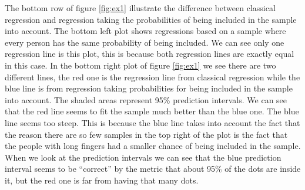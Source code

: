 \documentclass{article}
\begin{document}
\begin{example}
\begin{figure}
\end{figure}


The bottom row of figure \ref{fig:ex1} illustrate the difference between
classical regression and regression taking the probabilities of being included
in the sample into account. The bottom left plot shows regressions based on a
sample where every person has the same probability of being included. We can see
only one regression line is this plot, this is because both regression lines are
exactly equal in this case. In the bottom right plot of figure \ref{fig:ex1} we
see there are two different lines, the red one is the regression line from
classical regression while the blue line is from regression taking probabilities
for being included in the sample into account. The shaded areas represent 95\%
prediction intervals. We can see that the red line seems to fit the sample much
better than the blue one. The blue line seems too steep. This is because the
blue line takes into account the fact that the reason there are so few samples
in the top right of the plot is the fact that the people with long fingers had a
smaller chance of being included in the sample. When we look at the prediction
intervals we can see that the blue prediction interval seems to be ``correct''
by the metric that about 95\% of the dots are inside it, but the red one is far
from having that many dots.


\end{example}
\end{document}
